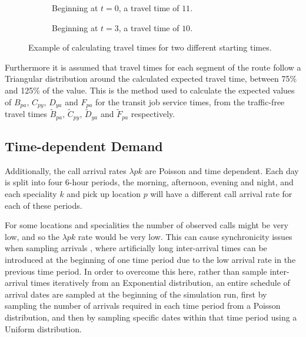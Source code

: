 \documentclass[preprint,12pt]{elsarticle}
\begin{document}
\begin{figure} \begin{center} \begin{subfigure}{6.6cm}
 \caption{Beginning at $t=0$, a
travel time of $11$.} \label{fig:travel_times_1} \end{subfigure}
\begin{subfigure}{6.6cm} 
\caption{Beginning at $t=3$, a travel time of $10$.} \label{fig:travel_times_2}
\end{subfigure} \end{center} \caption{Example of calculating travel times for
two different starting times.} \label{fig:travel_times} \end{figure}

Furthermore it is assumed that travel times for each segment of the route follow
a Triangular distribution around the calculated expected travel time, between
75\% and 125\% of the value.  This is the method used to calculate the expected
values of $B_{pa}$, $C_{py}$, $D_{ya}$ and $F_{pa}$ for the transit job service
times, from the traffic-free travel times $\tilde{B}_{pa}$, $\tilde{C}_{py}$,
$\tilde{D}_{ya}$ and $\tilde{F}_{pa}$ respectively.

\subsection{Time-dependent Demand} Additionally, the call arrival rates
$\lambda{pk}$ are Poisson and time dependent. Each day is split into four 6-hour
periods, the morning, afternoon, evening and night, and each speciality $k$ and
pick up location $p$ will have a different call arrival rate for each of these
periods.

For some locations and specialities the number of observed calls might be very
low, and so the $\lambda{pk}$ rate would be very low. This can cause
synchronicity issues when sampling arrivals \citep{pidd2004computer}, where
artificially long inter-arrival times can be introduced at the beginning of one
time period due to the low arrival rate in the previous time period.  In order
to overcome this here, rather than sample inter-arrival times iteratively from
an Exponential distribution, an entire schedule of arrival dates are sampled at
the beginning of the simulation run, first by sampling the number of arrivals
required in each time period from a Poisson distribution, and then by sampling
specific dates within that time period using a Uniform distribution.
\end{document}

